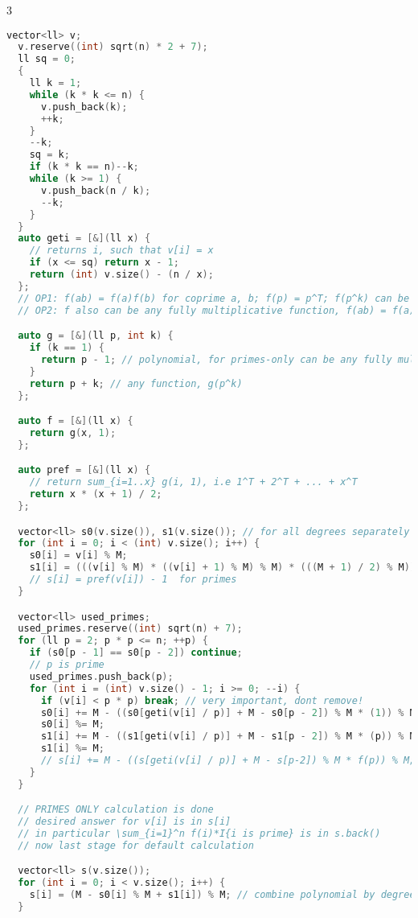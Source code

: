 \documentclass[9pt,a4paper,landscape,twosided]{extarticle}
\begin{document}
\begin{multicols*}{3}
\begin{lstlisting}[language=C++]
  vector<ll> v;
  v.reserve((int) sqrt(n) * 2 + 7);
  ll sq = 0;
  {
    ll k = 1;
    while (k * k <= n) {
      v.push_back(k);
      ++k;
    }
    --k;
    sq = k;
    if (k * k == n)--k;
    while (k >= 1) {
      v.push_back(n / k);
      --k;
    }
  }
  auto geti = [&](ll x) {
    // returns i, such that v[i] = x
    if (x <= sq) return x - 1;
    return (int) v.size() - (n / x);
  };
  // OP1: f(ab) = f(a)f(b) for coprime a, b; f(p) = p^T; f(p^k) can be calculated in O(1); we denote f(p^k) = g(p, k) (p is prime) for all k
  // OP2: f also can be any fully multiplicative function, f(ab) = f(a)f(b) for all a,b; you need to calc pref sum of f fast, so only prime case is useful

  auto g = [&](ll p, int k) {
    if (k == 1) {
      return p - 1; // polynomial, for primes-only can be any fully multiplicative function
    }
    return p + k; // any function, g(p^k)
  };

  auto f = [&](ll x) {
    return g(x, 1);
  };

  auto pref = [&](ll x) {
    // return sum_{i=1..x} g(i, 1), i.e 1^T + 2^T + ... + x^T
    return x * (x + 1) / 2;
  };

  vector<ll> s0(v.size()), s1(v.size()); // for all degrees separately
  for (int i = 0; i < (int) v.size(); i++) {
    s0[i] = v[i] % M;
    s1[i] = (((v[i] % M) * ((v[i] + 1) % M) % M) * (((M + 1) / 2) % M)) % M; // pref for g(p,1), degrees separately
    // s[i] = pref(v[i]) - 1  for primes
  }

  vector<ll> used_primes;
  used_primes.reserve((int) sqrt(n) + 7);
  for (ll p = 2; p * p <= n; ++p) {
    if (s0[p - 1] == s0[p - 2]) continue;
    // p is prime
    used_primes.push_back(p);
    for (int i = (int) v.size() - 1; i >= 0; --i) {
      if (v[i] < p * p) break; // very important, dont remove!
      s0[i] += M - ((s0[geti(v[i] / p)] + M - s0[p - 2]) % M * (1)) % M; // p^0
      s0[i] %= M;
      s1[i] += M - ((s1[geti(v[i] / p)] + M - s1[p - 2]) % M * (p)) % M; // p^1
      s1[i] %= M;
      // s[i] += M - ((s[geti(v[i] / p)] + M - s[p-2]) % M * f(p)) % M;
    }
  }

  // PRIMES ONLY calculation is done
  // desired answer for v[i] is in s[i]
  // in particular \sum_{i=1}^n f(i)*I{i is prime} is in s.back()
  // now last stage for default calculation

  vector<ll> s(v.size());
  for (int i = 0; i < v.size(); i++) {
    s[i] = (M - s0[i] % M + s1[i]) % M; // combine polynomial by degrees with needed coeffs
  }


\end{lstlisting}
\end{multicols*}
\end{document}
